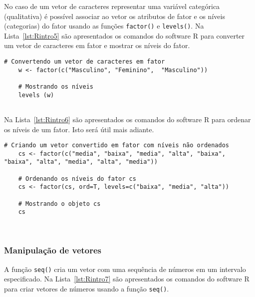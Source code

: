 \documentclass[11pt,fleqn]{book} %
\begin{document}
No caso de um vetor de caracteres representar uma variável categórica (qualitativa) é possível associar ao vetor os atributos de fator e os níveis (categorias) do fator usando as funções \texttt{factor()} e \texttt{levels()}. Na Lista~\ref{lst:Rintro5} são apresentados os comandos do software R para converter um vetor de caracteres em fator e mostrar os níveis do fator. \\

\begin{scriptsize}
	\estiloR
	\begin{lstlisting}[caption={Comandos do software R}, label=lst:Rintro5]
	# Convertendo um vetor de caracteres em fator
	w <- factor(c("Masculino", "Feminino",	"Masculino"))
	
	# Mostrando os níveis
	levels (w)
	
	\end{lstlisting}
\end{scriptsize}

Na Lista~\ref{lst:Rintro6} são apresentados os comandos do software R para ordenar os níveis de um fator. Isto será útil mais adiante. \\

\begin{scriptsize}
	\estiloR
	\begin{lstlisting}[caption={Comandos do software R}, label=lst:Rintro6]
	# Criando um vetor convertido em fator com níveis não ordenados
	cs <- factor(c("media", "baixa", "media", "alta", "baixa", "baixa", "alta", "media", "alta", "media"))

	# Ordenando os níveis do fator cs
	cs <- factor(cs, ord=T, levels=c("baixa", "media", "alta"))
	
	# Mostrando o objeto cs
	cs

	
	\end{lstlisting}
\end{scriptsize}



\subsubsection{Manipulação de vetores}

A função \texttt{seq()} cria um vetor com uma sequência de números em um intervalo especificado. Na Lista~\ref{lst:Rintro7} são apresentados os comandos do software R para criar vetores de números usando a função \texttt{seq()}. \\
\end{document}
